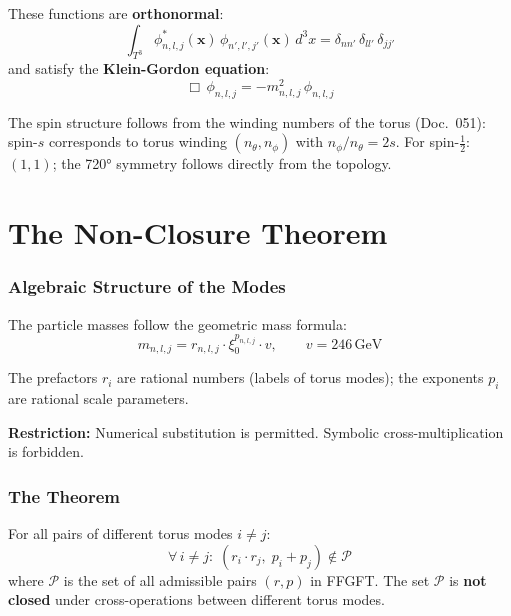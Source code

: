 These functions are \textbf{orthonormal}:
\begin{equation}
  \int_{T^3} \phi_{n,l,j}^*(\mathbf{x})\,\phi_{n',l',j'}(\mathbf{x})\,d^3x
  = \delta_{nn'}\,\delta_{ll'}\,\delta_{jj'}
\end{equation}
and satisfy the \textbf{Klein-Gordon equation}:
\begin{equation}
  \Box\,\phi_{n,l,j} = -m_{n,l,j}^2\,\phi_{n,l,j}
\end{equation}

The spin structure follows from the winding numbers of the torus
(Doc.~051): spin-$s$ corresponds to torus winding $(n_\theta, n_\phi)$
with $n_\phi/n_\theta = 2s$. For spin-$\tfrac{1}{2}$: $(1,1)$;
the 720° symmetry follows directly from the topology.

\part{The Non-Closure Theorem}

\section{Algebraic Structure of the Modes}

The particle masses follow the geometric mass formula:
\begin{equation}
  m_{n,l,j} = r_{n,l,j} \cdot \xi_0^{p_{n,l,j}} \cdot v,
  \qquad v = 246\,\text{GeV}
  \label{eq:massformula}
\end{equation}

The prefactors $r_i$ are rational numbers (labels of torus modes);
the exponents $p_i$ are rational scale parameters.

\textbf{Restriction:} Numerical substitution is permitted.
Symbolic cross-multiplication is forbidden.

\section{The Theorem}

\begin{tcolorbox}[colback=blue!5, colframe=blue!60!black, boxrule=0.8pt,
  arc=3pt, left=4mm, right=4mm,
  title={Non-Closure Theorem of FFGFT Torus Modes}]
For all pairs of different torus modes $i \neq j$:
\[
  \forall\, i \neq j:\;
  (r_i \cdot r_j,\; p_i + p_j) \notin \mathcal{P}
\]
where $\mathcal{P}$ is the set of all admissible pairs $(r,p)$ in FFGFT.
The set $\mathcal{P}$ is \textbf{not closed} under cross-operations
between different torus modes.
\end{tcolorbox}

